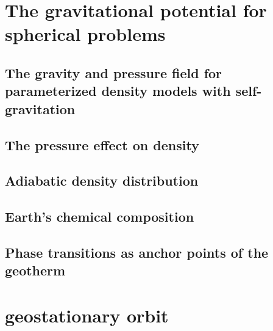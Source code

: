 \section{The gravitational potential for spherical problems}
  

\subsection{The gravity and pressure field for parameterized density models with self-gravitation}
\label{sect_param_densmod}  %
\subsection{The pressure effect on density} %
\label{Pressure_density}  %
\subsection{Adiabatic density distribution} %
\label{Adiabatic density distribution}  %
\subsection{Earth's chemical composition} %
\label{section-chemical-composition}  %
\subsection{Phase transitions as anchor points of the geotherm} %
\label{section-anchor points}  %

\section{geostationary orbit}


\newpage
